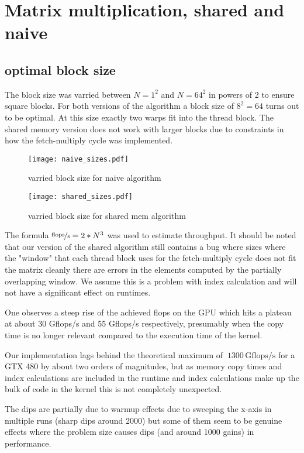 \section{Matrix multiplication, shared and naive}
\subsection{optimal block size}
The block size was varried between $N=1^2$ and $N=64^2$ in powers of 2 to ensure square blocks. For both versions of the algorithm a block size of $8^2=64$ turns out to be optimal. At this size exactly two warps fit into the thread block.
The shared memory version does not work with larger blocks due to constraints in how the fetch-multiply cycle was implemented. 

\begin{figure}[h!]
    \centering
    \texttt{[image: naive\_sizes.pdf]}
    \caption{varried block size for naive algorithm}
    \end{figure}

\begin{figure}[h!]
    \centering
    \texttt{[image: shared\_sizes.pdf]}
    \caption{varried block size for shared mem algorithm}
    \end{figure}

The formula $\nicefrac{\mathrm{flops}}{\mathrm s} = 2*N^3$ was used to estimate throughput. It should be noted that our version of the shared algorithm still contains a bug where sizes where the "window" that each thread block uses for the fetch-multiply cycle does not fit the matrix cleanly there are errors in the elements computed by the partially overlapping window. We assume this is a problem with index calculation and will not have a significant effect on runtimes.

One observes a steep rise of the achieved flops on the GPU which hits a plateau at about 30 Gflops/s and 55 Gflops/s respectively, presumably when the copy time is no longer relevant compared to the execution time of the kernel.

Our implementation lags behind the theoretical maximum of $~1300 \, \mathrm{Gflops/s}$ for a GTX 480 by about two orders of magnitudes, but as memory copy times and index calculations are included in the runtime and index calculations make up the bulk of code in the kernel this is not completely unexpected.

The dips are partially due to warmup effects due to sweeping the x-axis in multiple runs (sharp dips around 2000) but some of them seem to be genuine effects where the problem size causes dips (and around 1000 gains) in performance.

